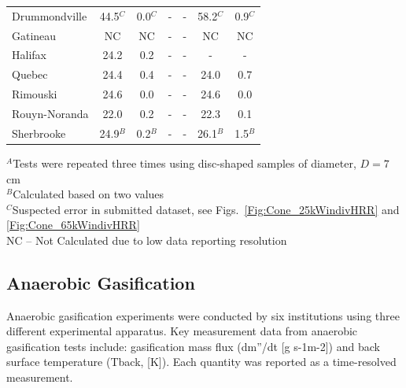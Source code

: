 \documentclass{book}
\begin{document}
\begin{table}[ht]
\begin{center}
\begin{tabular}{|l|cc|cc|cc|}
Drummondville                           & 44.5$^C$ & 0.0$^C$                & -                     & -                      & 58.2$^C$              & 0.9$^C$                   \\
Gatineau                                & NC       & NC                     & -                     & -                      & NC                    & NC                        \\
Halifax                                 & 24.2     & 0.2                    & -                     & -                      & -                     & -                         \\
Quebec                                  & 24.4     & 0.4                    & -                     & -                      & 24.0                  & 0.7                       \\
Rimouski                                & 24.6     & 0.0                    & -                     & -                      & 24.6                  & 0.0                       \\
Rouyn-Noranda                           & 22.0     & 0.2                    & -                     & -                      & 22.3                  & 0.1                       \\
Sherbrooke                              & 24.9$^B$ & 0.2$^B$                & -                     & -                      & 26.1$^B$              & 1.5$^B$                   \\ \hline
\end{tabular}
\end{center}
$^A$Tests were repeated three times using disc-shaped samples of diameter, $D = 7$ cm \\
$^B$Calculated based on two values \\
$^C$Suspected error in submitted dataset, see Figs.~\ref{Fig:Cone_25kWindivHRR} and \ref{Fig:Cone_65kWindivHRR} \\
NC – Not Calculated due to low data reporting resolution
\end{table}



\subsection{Anaerobic Gasification}

Anaerobic gasification experiments were conducted by six institutions using three different experimental apparatus. Key measurement data from anaerobic gasification tests include: gasification mass flux (dm”/dt [g s-1m-2]) and back surface temperature (Tback, [K]). Each quantity was reported as a time-resolved measurement.
\end{document}
